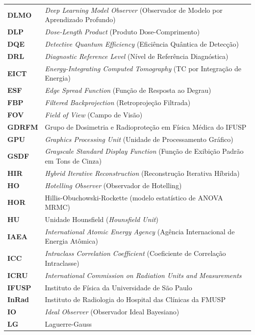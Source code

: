\documentclass[
  12pt,
  a4paper,
  oneside
]{report}
\begin{document}
\begin{longtable}{ll}
\textbf{DLMO} & \emph{Deep Learning Model Observer} (Observador de Modelo por Aprendizado Profundo) \\
\textbf{DLP} & \emph{Dose-Length Product} (Produto Dose-Comprimento) \\
\textbf{DQE} & \emph{Detective Quantum Efficiency} (Eficiência Quântica de Detecção) \\
\textbf{DRL} & \emph{Diagnostic Reference Level} (Nível de Referência Diagnóstica) \\
\textbf{EICT} & \emph{Energy-Integrating Computed Tomography} (TC por Integração de Energia) \\
\textbf{ESF} & \emph{Edge Spread Function} (Função de Resposta ao Degrau) \\
\textbf{FBP} & \emph{Filtered Backprojection} (Retroprojeção Filtrada) \\
\textbf{FOV} & \emph{Field of View} (Campo de Visão) \\
\textbf{GDRFM} & Grupo de Dosimetria e Radioproteção em Física Médica do IFUSP \\
\textbf{GPU} & \emph{Graphics Processing Unit} (Unidade de Processamento Gráfico) \\
\textbf{GSDF} & \emph{Grayscale Standard Display Function} (Função de Exibição Padrão em Tons de Cinza) \\
\textbf{HIR} & \emph{Hybrid Iterative Reconstruction} (Reconstrução Iterativa Híbrida) \\
\textbf{HO} & \emph{Hotelling Observer} (Observador de Hotelling) \\
\textbf{HOR} & Hillis-Obuchowski-Rockette (modelo estatístico de ANOVA MRMC) \\
\textbf{HU} & Unidade Hounsfield (\emph{Hounsfield Unit}) \\
\textbf{IAEA} & \emph{International Atomic Energy Agency} (Agência Internacional de Energia Atômica) \\
\textbf{ICC} & \emph{Intraclass Correlation Coefficient} (Coeficiente de Correlação Intraclasse) \\
\textbf{ICRU} & \emph{International Commission on Radiation Units and Measurements} \\
\textbf{IFUSP} & Instituto de Física da Universidade de São Paulo \\
\textbf{InRad} & Instituto de Radiologia do Hospital das Clínicas da FMUSP \\
\textbf{IO} & \emph{Ideal Observer} (Observador Ideal Bayesiano) \\
\textbf{LG} & Laguerre-Gauss \\

\end{longtable}
\end{document}
